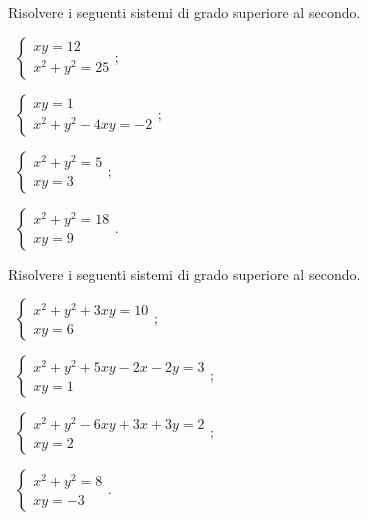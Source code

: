 \begin{esercizio}[\Ast]
 \label{ese:6.33}
Risolvere i seguenti sistemi di grado superiore al secondo.
\begin{multicols}{2}
 \begin{enumeratea}
 \item~$\left\{\begin{array}{l}xy=12 \\x^2+y^2=25\end{array}\right.$;
 \item~$\left\{\begin{array}{l}xy=1 \\x^2+y^2-4xy=-2\end{array}\right.$;
 \item~$\left\{\begin{array}{l}x^2+y^2=5\\xy=3 \end{array}\right.$;
 \item~$\left\{\begin{array}{l}x^2+y^2=18\\xy=9 \end{array}\right.$.
 \end{enumeratea}
 \end{multicols}
\end{esercizio}

\begin{esercizio}[\Ast]
 \label{ese:6.34}
Risolvere i seguenti sistemi di grado superiore al secondo.
\begin{multicols}{2}
 \begin{enumeratea}
 \item~$\left\{\begin{array}{l}x^2+y^2+3xy=10\\xy=6 \end{array}\right.$;
 \item~$\left\{\begin{array}{l}x^2+y^2+5xy-2x-2y=3\\xy=1 \end{array}\right.$;
 \item~$\left\{\begin{array}{l}x^2+y^2-6xy+3x+3y=2\\xy=2 \end{array}\right.$;
 \item~$\left\{\begin{array}{l}x^2+y^2=8\\xy=-3\end{array}\right.$.
 \end{enumeratea}
 \end{multicols}
\end{esercizio}

